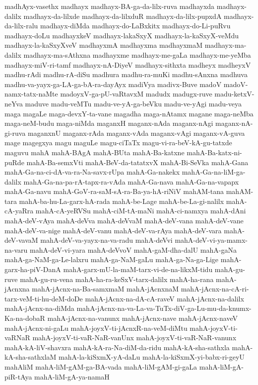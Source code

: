 {madhAyx-vasethx
madhayx
madhayx-BA-ga-da-lilx-ruva
madhayxda
madhayx-dalilx
madhayx-da-lilxde
madhayx-da-lilxduR
madhayx-da-lilx-pupxdA
madhayx-da-lilx-ralu
madhayx-diMda
madhayx-do-LaBxkitx
madhayx-do-Li-puRvu
madhayx-doLu
madhayxkeV
madhayx-lakaSxyX
madhayx-la-kaSxyX-veMdu
madhayx-la-kaSxyXveV
madhayxmA
madhayxma
madhayxmaM
madhayx-ma-dalilx
madhayx-ma-sAthxna
madhayxme
madhayx-me-gaLa
madhayx-me-yeMba
madhayx-miV-ri-tamf
madhayx-nA-DiyeV
madhayx-sithxta
madheyx
madheyxV
madhu-rAdi
madhu-rA-diSu
madhura
madhu-ra-muKi
madhu-sAnxna
madhuva
madhu-va-yayx-ga-LA-ga-bA-ra-dayAyx
madiVya
madivx-Buve
madoV
madoV-namx-tatx-naMte
madoyxV-ga-pU-vaRtavxM
madudx
madugx-ruve
madu-ketxV-neYva
maduve
madu-veMTu
madu-ve-yA-ga-beVku
madu-ve-yAgi
madu-veya
maga
magaLe
maga-devxY-ta-vane
magadha
maga-nAtamx
magane
maga-neMba
maga-neM-budu
maga-niMda
maganxH
maganx-nAda
maganx-nAgi
maganx-nA-gi-ruva
maganxnU
maganx-rAda
maganx-vAda
maganx-vAgi
maganx-vA-guva
mage
magegxya
magu
maguLe
magu-ciTaTx
magu-vi-ra-beV-kA-gu-tatxde
maguvu
mahA
mahA-BAgA
mahA-BUta
mahA-Ba-katxne
mahA-Ba-katx-ni-puRde
mahA-Ba-semxVti
mahA-BeV-da-tatatxvX
mahA-Bi-SeVka
mahA-Gana
mahA-Ga-na-ci-dA-va-ra-Na-savx-rUpa
mahA-Ga-nakekx
mahA-Ga-na-liM-ga-dalilx
mahA-Ga-na-pa-rA-tapx-ra-vAda
mahA-Ga-nava
mahA-Ga-na-vapapx
mahA-Ga-navu
mahA-GoV-ra-saM-sA-ra-Ba-ya-hA-riNiV
mahAM-tana
mahAM-tara
mahA-ba-hu-La-garx-hA-rada
mahA-be-Lage
mahA-be-La-gi-nalilx
mahA-cA-yaRra
mahA-cA-yeRVSu
mahA-ciM-tA-maNi
mahA-ci-namxya
mahA-dAni
mahA-deV-vAya
mahA-deVva
mahA-deVvaM
mahA-deV-vana
mahA-deV-vane
mahA-deV-va-nige
mahA-deV-vanu
mahA-deV-va-rAya
mahA-deV-vara
mahA-deV-vavaM
mahA-deV-va-yayx-na-va-radu
mahA-deVvi
mahA-deV-vi-ya-mamx-na-varu
mahA-deV-vi-yara
mahA-deVvoV
mahA-gaM-dha-dalU
mahA-gaNa
mahA-ga-NaM-ga-Le-lalxru
mahA-ga-NaM-gaLu
mahA-ga-Na-ga-Lige
mahA-garx-ha-piV-DanA
mahA-garx-mU-la-maM-tarx-vi-de-na-likxM-tidu
mahA-gu-ruve
mahA-gu-ru-vena
mahA-ha-ra-keSxV-tarx-dalilx
mahA-ha-rana
mahA-jAcnxna
mahA-jAcnx-na-Ba-samxmaM
mahA-jAcnxnaM
mahA-jAcnx-na-cA-ri-tarx-veM-ti-hu-deM-doDe
mahA-jAcnx-na-dA-cA-raveV
mahA-jAcnx-na-dalilx
mahA-jAcnx-na-diMda
mahA-jAcnx-na-va-La-va-TuTx-diV-ga-Lu-mu-da-knumx-Ka-na-dobaR
mahA-jAcnx-na-vanunx
mahA-jAcnx-nave
mahA-jAcnx-naveV
mahA-jAcnx-ni-gaLu
mahA-joyxV-ti-jAcnxR-na-veM-diMtu
mahA-joyxV-ti-vaRNaR
mahA-joyxV-ti-vaR-NaR-vanUnx
mahA-joyxV-ti-vaR-NaR-vanunx
mahA-kA-liV-shavxra
mahA-kA-ra-Na-diM-da-ridu
mahA-kA-sha-sathxla
mahA-kA-sha-sathxlaM
mahA-la-kiSxmX-yA-daLu
mahA-la-kiSxmX-yi-babx-ri-geyU
mahAliM
mahA-liM-gAM-ga-BA-vada
mahA-liM-gAM-gi-gaLa
mahA-liM-gA-piR-tAya
mahA-liM-gA-ya-namaH
}

